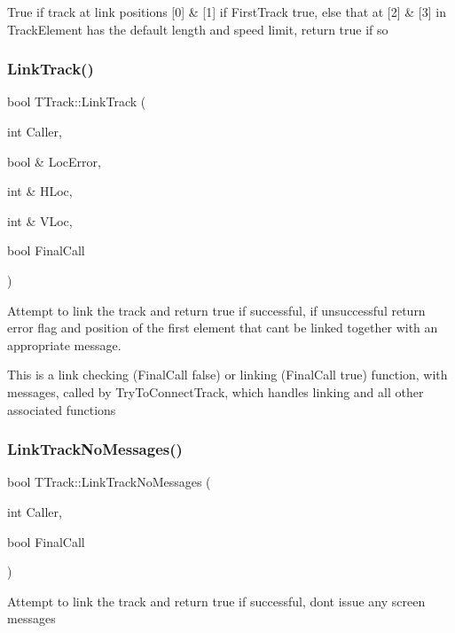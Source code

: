 True if track at link positions \mbox{[}0\mbox{]} \& \mbox{[}1\mbox{]} if First\+Track true, else that at \mbox{[}2\mbox{]} \& \mbox{[}3\mbox{]} in Track\+Element has the default length and speed limit, return true if so \mbox{\label{class_t_track_a17b6095b0c8de0e1493eeebd6d534247}} 
\subsubsection{\texorpdfstring{Link\+Track()}{LinkTrack()}}
{\footnotesize\ttfamily bool T\+Track\+::\+Link\+Track (\begin{DoxyParamCaption}\item[{int}]{Caller,  }\item[{bool \&}]{Loc\+Error,  }\item[{int \&}]{H\+Loc,  }\item[{int \&}]{V\+Loc,  }\item[{bool}]{Final\+Call }\end{DoxyParamCaption})}

Attempt to link the track and return true if successful, if unsuccessful return error flag and position of the first element that can\textquotesingle{}t be linked together with an appropriate message.

This is a link checking (Final\+Call false) or linking (Final\+Call true) function, with messages, called by Try\+To\+Connect\+Track, which handles linking and all other associated functions \mbox{\label{class_t_track_a42f410832651458a4a34769ef95be51b}} 
\subsubsection{\texorpdfstring{Link\+Track\+No\+Messages()}{LinkTrackNoMessages()}}
{\footnotesize\ttfamily bool T\+Track\+::\+Link\+Track\+No\+Messages (\begin{DoxyParamCaption}\item[{int}]{Caller,  }\item[{bool}]{Final\+Call }\end{DoxyParamCaption})}

Attempt to link the track and return true if successful, don\textquotesingle{}t issue any screen messages

